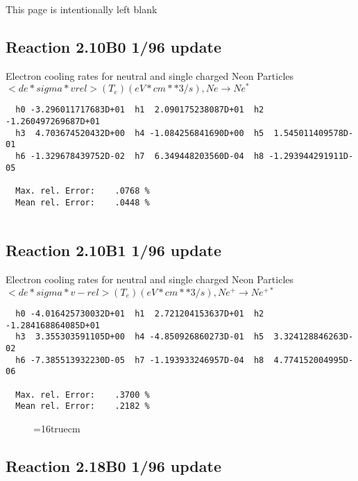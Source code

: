 \documentclass[12pt]{article}
\begin{document}
\newpage
This page is intentionally left blank
\newpage

\subsection{
Reaction 2.10B0                   1/96 update
}

  Electron cooling rates for neutral and single
  charged Neon Particles
 $<de*sigma*vrel>(T_e)  (eV*cm**3/s), Ne  \rightarrow  Ne^*$

\begin{small}\begin{verbatim}
  h0 -3.296011717683D+01  h1  2.090175238087D+01  h2 -1.260497269687D+01
  h3  4.703674520432D+00  h4 -1.084256841690D+00  h5  1.545011409578D-01
  h6 -1.329678439752D-02  h7  6.349448203560D-04  h8 -1.293944291911D-05

  Max. rel. Error:    .0768 %
  Mean rel. Error:    .0448 %


\end{verbatim}\end{small}


\subsection{
Reaction 2.10B1                   1/96 update
}

  Electron cooling rates for neutral and single
  charged Neon Particles
 $ <de*sigma*v-rel>(T_e)  (eV*cm**3/s), Ne^+ \rightarrow Ne^{+*} $

\begin{small}\begin{verbatim}
  h0 -4.016425730032D+01  h1  2.721204153637D+01  h2 -1.284168864085D+01
  h3  3.355303591105D+00  h4 -4.850926860273D-01  h5  3.324128846263D-02
  h6 -7.385513932230D-05  h7 -1.193933246957D-04  h8  4.774152004995D-06

  Max. rel. Error:    .3700 %
  Mean rel. Error:    .2182 %

\end{verbatim}\end{small}

\begin{figure} \label{2.10l}
\epsfxsize=16truecm
\end{figure}
\newpage

\subsection{
Reaction 2.18B0                   1/96 update
}
\end{document}
